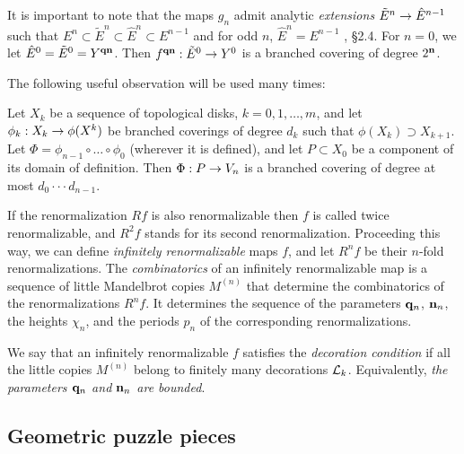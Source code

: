 \msk
It is important to note that the maps $g_n$ admit analytic {\it extensions} $\tilde E^n\rightarrow \hat E^{n-1}$
such that $E^n\subset \tilde E^n \subset \hat E^n\subset E^{n-1}$ and for odd $n$,
$\hat E^n=E^{n-1}$ \cite{KL-high}, \S 2.4. For $n=0$, we let $\hat E^0 =\tilde E^0 = Y^{{\mathbf{q}}{\mathbf{n}}}$.
Then $ f^{{\mathbf{q}}{\mathbf{n}}}: \tilde E^0 \rightarrow Y^0$ is a branched covering of degree $2^{\mathbf{n}}$.

\msk
The following useful observation will be used many times:

\begin{lem}[Telescope]\label{telescope}
  Let $X_k$ be a sequence of topological disks, $k=0,1,\dots, m$,
and let $\phi_k : X_k \rightarrow \phi(X^k)$  be  branched coverings of degree $d_k$ such that
$\phi(X_k)\supset X_{k+1}$. Let $\Phi= \phi_{n-1}\circ\dots\circ \phi_0$ (wherever it is defined),
and let $P\subset X_0$ be a component of its domain of definition.
Then $\Phi: P \rightarrow V_n$ is a branched covering of degree at most $d_0\cdot\cdot\cdot d_{n-1}$.
\end{lem}


If the renormalization $Rf$ is also renormalizable then $f$ is called twice renormalizable,
and $R^2 f$ stands for its second renormalization. Proceeding this way, we can define
{\it infinitely renormalizable} maps $f$, and let $R^n f$ be their $n$-fold renormalizations.
The {\it combinatorics} of an infinitely renormalizable map is a sequence
of little Mandelbrot copies $M^{(n)}$ that determine the combinatorics of the renormalizations $R^n f$.
It determines the sequence of the parameters ${\mathbf{q}}_n$, ${\mathbf{n}}_n$, the heights $\chi_n$,
and the periods $p_n$ of the corresponding renormalizations.

We say that an infinitely renormalizable $f$ satisfies the {\it decoration condition}
if all the little copies $M^{(n)}$ belong to  finitely many decorations ${\mathcal L}_k$.
Equivalently, {\it the parameters ${\mathbf{q}}_n$ and ${\mathbf{n}}_n$ are bounded}.






\subsection{Geometric puzzle pieces}

